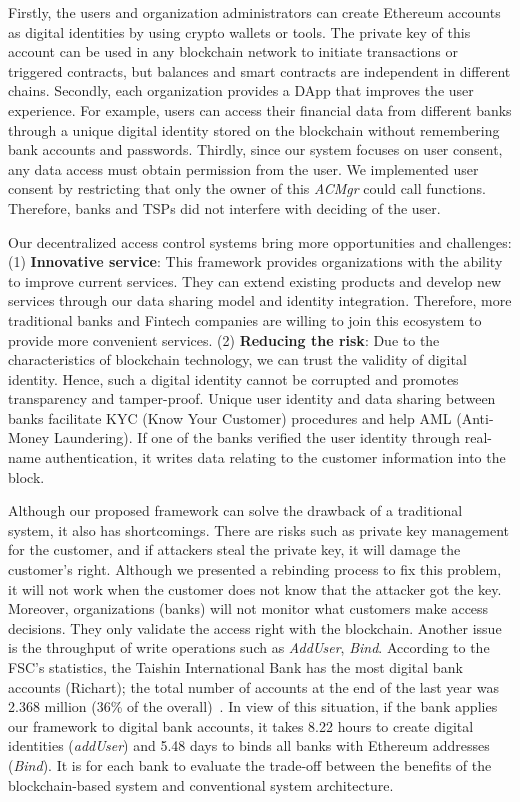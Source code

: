 Firstly, the users and organization administrators can create Ethereum accounts as digital identities by using crypto wallets or tools. The private key of this account can be used in any blockchain network to initiate transactions or triggered contracts, but balances and smart contracts are independent in different chains. Secondly, each organization provides a DApp that improves the user experience. For example, users can access their financial data from different banks through a unique digital identity stored on the blockchain without remembering bank accounts and passwords. Thirdly, since our system focuses on user consent, any data access must obtain permission from the user. We implemented user consent by restricting that only the owner of this \textit{ACMgr} could call functions. Therefore, banks and TSPs did not interfere with deciding of the user.
\par 

Our decentralized access control systems bring more opportunities and challenges: (1) \textbf{Innovative service}: This framework provides organizations with the ability to improve current services. They can extend existing products and develop new services through our data sharing model and identity integration. Therefore, more traditional banks and Fintech companies are willing to join this ecosystem to provide more convenient services.  (2) \textbf{Reducing the risk}: Due to the characteristics of blockchain technology, we can trust the validity of digital identity. Hence, such a digital identity cannot be corrupted and promotes transparency and tamper-proof. Unique user identity and data sharing between banks facilitate KYC (Know Your Customer) procedures and help AML (Anti-Money Laundering). If one of the banks verified the user identity through real-name authentication, it writes data relating to the customer information into the block.

Although our proposed framework can solve the drawback of a traditional system, it also has shortcomings. There are risks such as private key management for the customer, and if attackers steal the private key, it will damage the customer's right. Although we presented a rebinding process to fix this problem, it will not work when the customer does not know that the attacker got the key. Moreover, organizations (banks) will not monitor what customers make access decisions. They only validate the access right with the blockchain. Another issue is the throughput of write operations such as \textit{AddUser}, \textit{Bind}. According to the FSC's statistics, the Taishin International Bank has the most digital bank accounts (Richart); the total number of accounts at the end of the last year was 2.368 million (36\% of the overall)~\cite{cna_2021}. In view of this situation, if the bank applies our framework to digital bank accounts, it takes 8.22 hours to create digital identities (\textit{addUser}) and 5.48 days to binds all banks with Ethereum addresses (\textit{Bind}). It is for each bank to evaluate the trade-off between the benefits of the blockchain-based system and conventional system architecture.
